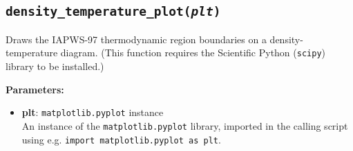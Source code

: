 \begin{snugshade}
\subsection{\texttt{density\_temperature\_plot(\emph{plt})}}
\end{snugshade}
\label{sec:iapws97:density_temperature_plot}

Draws the IAPWS-97 thermodynamic region boundaries on a density-temperature diagram.  (This function requires the Scientific Python (\texttt{scipy}) library to be installed.)

\textbf{Parameters:}
\begin{itemize}
\item \textbf{plt}: \texttt{matplotlib.pyplot} instance\\
  An instance of the \texttt{matplotlib.pyplot} library, imported in the calling script using e.g. \texttt{import matplotlib.pyplot as plt}.
\end{itemize}
